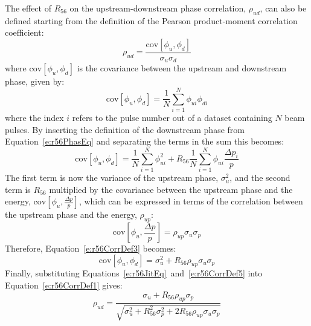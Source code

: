 The effect of \(R_{56}\) on the upstream-downstream phase correlation, \(\rho_{ud}\), can also be defined starting from the definition of the Pearson product-moment correlation coefficient:
\begin{equation}
\rho_{ud} = \frac{\mathrm{cov}\left[\phi_u,\phi_d\right]}{\sigma_u\sigma_d}
\label{e:r56CorrDef1}
\end{equation}
where \(\mathrm{cov}\left[\phi_u,\phi_d\right]\) is the covariance between the upstream and downstream phase, given by:
\begin{equation}
 \mathrm{cov}\left[\phi_u,\phi_d\right] = \frac{1}{N} \sum_{i=1}^{N}\phi_{ui}\phi_{di}
\label{e:r56CorrDef2}
\end{equation} 
where the index \(i\) refers to the pulse number out of a dataset containing \(N\) beam pulses. By inserting the definition of the downstream phase from Equation~\ref{e:r56PhasEq} and separating the terms in the sum this becomes:
\begin{equation}
\mathrm{cov}\left[\phi_u,\phi_d\right] = \frac{1}{N} \sum_{i=1}^{N}\phi_{ui}^{2} + R_{56}\frac{1}{N} \sum_{i=1}^{N}\phi_{ui}\frac{\Delta p_i}{p}
\label{e:r56CorrDef3}
\end{equation}
The first term is now the variance of the upstream phase, \(\sigma_u^2\), and the second term is \(R_{56}\) multiplied by the covariance between the upstream phase and the energy, \(\mathrm{cov}\left[\phi_u,\frac{\Delta p}{p}\right]\), which can be expressed in terms of the correlation between the upstream phase and the energy, \(\rho_{up}\):
\begin{equation}
\mathrm{cov}\left[\phi_u,\frac{\Delta p}{p}\right] = \rho_{up}\sigma_u\sigma_{p}
\label{e:r56CorrDef4}
\end{equation}
Therefore, Equation~\ref{e:r56CorrDef3} becomes:
\begin{equation}
\mathrm{cov}\left[\phi_u,\phi_d\right] = \sigma_u^2 + R_{56}\rho_{up}\sigma_u\sigma_p
\label{e:r56CorrDef5}
\end{equation}
Finally, substituting Equations~\ref{e:r56JitEq}~and~\ref{e:r56CorrDef5} into Equation~\ref{e:r56CorrDef1} gives:
\begin{equation}
\rho_{ud} = \frac{\sigma_u + R_{56}\rho_{up}\sigma_p}{\sqrt{\sigma_u^2 + R_{56}^2\sigma_{p}^2 + 2R_{56}\rho_{up}\sigma_{u}\sigma_{p}}}
\label{e:r56CorrDefFinal}
\end{equation}

